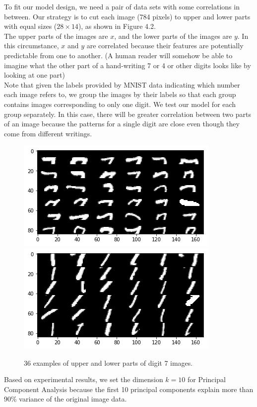 \documentclass[12pt]{report} %
\begin{document}
To fit our model design, we need a pair of data sets with some correlations in between. Our strategy is to cut each image (784 pixels) to upper and lower parts with equal sizes ($28 \times 14$), as shown in Figure 4.2. \\
The upper parts of the images are $x$, and the lower parts of the images are $y$. In this circumstance, $x$ and $y$ are correlated because their features are potentially predictable from one to another. (A human reader will somehow be able to imagine what the other part of a hand-writing 7 or 4 or other digits looks like by looking at one part)\\
Note that given the labels provided by MNIST data indicating which number each image refers to, we group the images by their labels so that each group contains images corresponding to only one digit. We test our model for each group separately. In this case, there will be greater correlation between two parts of an image because the patterns for a single digit are close even though they come from different writings.
\begin{figure}[H]
	\centering
	\includegraphics[scale=0.8]{pictures/MNIST_up.png}
	\includegraphics[scale=0.8]{pictures/MNIST_down.png}
	\caption{36 examples of upper and lower parts of digit 7 images.}
	\label{fig:2}
\end{figure}
Based on experimental results, we set the dimension $k=10$ for Principal Component Analysis because the first 10 principal components explain more than 90\% variance of the original image data.
\end{document}
